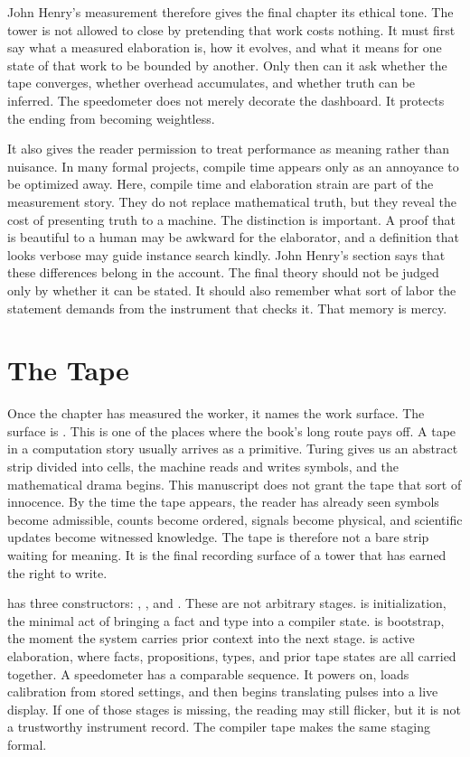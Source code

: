 John Henry's measurement therefore gives the final chapter its ethical tone.
The tower is not allowed to close by pretending that work costs nothing. It
must first say what a measured elaboration is, how it evolves, and what it
means for one state of that work to be bounded by another. Only then can it
ask whether the tape converges, whether overhead accumulates, and whether
truth can be inferred. The speedometer does not merely decorate the dashboard.
It protects the ending from becoming weightless.

It also gives the reader permission to treat performance as meaning rather
than nuisance. In many formal projects, compile time appears only as an
annoyance to be optimized away. Here, compile time and elaboration strain are
part of the measurement story. They do not replace mathematical truth, but
they reveal the cost of presenting truth to a machine. The distinction is
important. A proof that is beautiful to a human may be awkward for the
elaborator, and a definition that looks verbose may guide instance search
kindly. John Henry's section says that these differences belong in the
account. The final theory should not be judged only by whether it can be
stated. It should also remember what sort of labor the statement demands from
the instrument that checks it.
That memory is mercy.

\section{The Tape}
\label{se:the-tape}

Once the chapter has measured the worker, it names the work surface. The
surface is . This is one of the places where the book's
long route pays off. A tape in a computation story usually arrives as a
primitive. Turing gives us an abstract strip divided into cells, the machine
reads and writes symbols, and the mathematical drama begins. This manuscript
does not grant the tape that sort of innocence. By the time the tape appears,
the reader has already seen symbols become admissible, counts become ordered,
signals become physical, and scientific updates become witnessed knowledge.
The tape is therefore not a bare strip waiting for meaning. It is the final
recording surface of a tower that has earned the right to write.

 has three constructors: , , and
. These are not arbitrary stages.  is initialization,
the minimal act of bringing a fact and type into a compiler state.
 is bootstrap, the moment the system carries prior context into
the next stage.  is active elaboration, where facts,
propositions, types, and prior tape states are all carried together. A
speedometer has a comparable sequence. It powers on, loads calibration from
stored settings, and then begins translating pulses into a live display. If
one of those stages is missing, the reading may still flicker, but it is not a
trustworthy instrument record. The compiler tape makes the same staging
formal.

